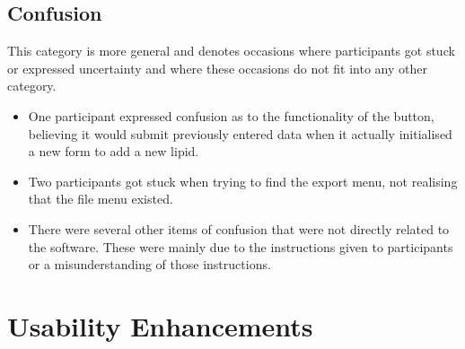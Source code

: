 \documentclass{l4proj}
\begin{document}
\subsection{Confusion}
This category is more general and denotes occasions where participants got stuck or expressed uncertainty and where these occasions do not fit into any other category.
\begin{itemize}
    \item One participant expressed confusion as to the functionality of the  button, believing it would submit previously entered data when it actually initialised a new form to add a new lipid.
    \item Two participants got stuck when trying to find the export menu, not realising that the file menu existed.
    \item There were several other items of confusion that were not directly related to the software. These were mainly due to the instructions given to participants or a misunderstanding of those instructions.
\end{itemize}

\section{Usability Enhancements} \label{usability-enhancements}
\end{document}

